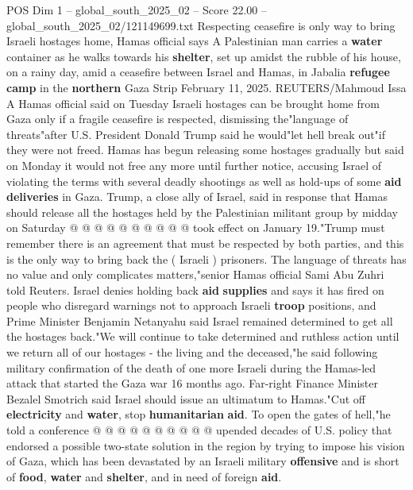\begin{textsample}{POS Dim 1 – global\_south\_2025\_02 – Score 22.00 – global\_south\_2025\_02/121149699.txt}  \label{ex:f1_pos_416}
Respecting ceasefire is only way to bring Israeli hostages home, Hamas official says A Palestinian man carries a \textbf{water} container as he walks towards his \textbf{shelter}, set up amidst the rubble of his house, on a rainy day, amid a ceasefire between Israel and Hamas, in Jabalia \textbf{refugee} \textbf{camp} in the \textbf{northern} Gaza Strip February 11, 2025.
REUTERS/Mahmoud Issa A Hamas official said on Tuesday Israeli hostages can be brought home from Gaza only if a fragile ceasefire is respected, dismissing the"language of threats"after U.S.
President Donald Trump said he would"let hell break out"if they were not freed.
Hamas has begun releasing some hostages gradually but said on Monday it would not free any more until further notice, accusing Israel of violating the terms with several deadly shootings as well as hold-ups of some \textbf{aid} \textbf{deliveries} in Gaza.
Trump, a close ally of Israel, said in response that Hamas should release all the hostages held by the Palestinian militant group by midday on Saturday @ @ @ @ @ @ @ @ @ @ took effect on January 19."Trump must remember there is an agreement that must be respected by both parties, and this is the only way to bring back the ( Israeli ) prisoners.
The language of threats has no value and only complicates matters,"senior Hamas official Sami Abu Zuhri told Reuters.
Israel denies holding back \textbf{aid} \textbf{supplies} and says it has fired on people who disregard warnings not to approach Israeli \textbf{troop} positions, and Prime Minister Benjamin Netanyahu said Israel remained determined to get all the hostages back."We will continue to take determined and ruthless action until we return all of our hostages - the living and the deceased,"he said following military confirmation of the death of one more Israeli during the Hamas-led attack that started the Gaza war 16 months ago.
Far-right Finance Minister Bezalel Smotrich said Israel should issue an ultimatum to Hamas."Cut off \textbf{electricity} and \textbf{water}, stop \textbf{humanitarian} \textbf{aid}.
To open the gates of hell,"he told a conference @ @ @ @ @ @ @ @ @ @ upended decades of U.S. policy that endorsed a possible two-state solution in the region by trying to impose his vision of Gaza, which has been devastated by an Israeli military \textbf{offensive} and is short of \textbf{food}, \textbf{water} and \textbf{shelter}, and in need of foreign \textbf{aid}.

\end{textsample}
